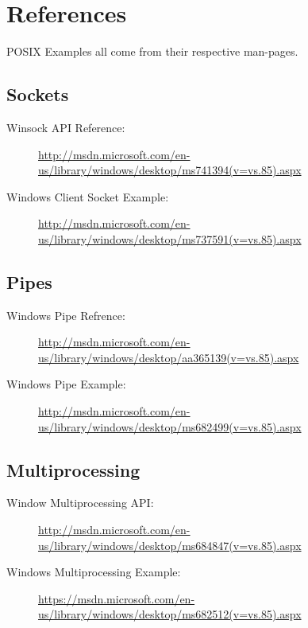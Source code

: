 \documentclass[letterpaper,10pt]{article}
\begin{document}
\newpage

\section*{References}

POSIX Examples all come from their respective man-pages.

\subsection{Sockets}
\begin{description}
\item[Winsock API Reference:]
    \url{http://msdn.microsoft.com/en-us/library/windows/desktop/ms741394(v=vs.85).aspx}

\item [Windows Client Socket Example:] \url{http://msdn.microsoft.com/en-us/library/windows/desktop/ms737591(v=vs.85).aspx}
\end{description}

\subsection{Pipes}
\begin{description}
\item [Windows Pipe Refrence:]
    \url{http://msdn.microsoft.com/en-us/library/windows/desktop/aa365139(v=vs.85).aspx}

\item [Windows Pipe Example:]
    \url{http://msdn.microsoft.com/en-us/library/windows/desktop/ms682499(v=vs.85).aspx}
\end{description}

\subsection{Multiprocessing}
\begin{description}
\item [Window Multiprocessing API:]
    \url{http://msdn.microsoft.com/en-us/library/windows/desktop/ms684847(v=vs.85).aspx}

\item [Windows Multiprocessing Example:]
    \url{https://msdn.microsoft.com/en-us/library/windows/desktop/ms682512(v=vs.85).aspx}
\end{description}
\end{document}
